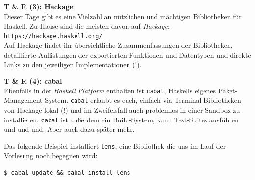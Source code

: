 \documentclass[unknownkeysallowed]{beamer}
\begin{document}
  
  \begin{frame}
    \begin{center}
    \Large\textbf{T \& R (3): Hackage}\\ \bigskip \normalsize
    Dieser Tage gibt es eine Vielzahl an nützlichen und mächtigen Bibliotheken für Haskell. Zu Hause sind die meisten davon auf \emph{Hackage}: \\ \bigskip \texttt{https://hackage.haskell.org/} \\ \bigskip
    Auf Hackage findet ihr übersichtliche Zusammenfassungen der Bibliotheken, detaillierte Auflistungen der exportierten Funktionen und Datentypen und direkte Links zu den jeweiligen Implementationen (!).
    \end{center}
  \end{frame}
  
  
  \begin{frame}
    \begin{center}
    \Large\textbf{T \& R (4): cabal}\\ \bigskip \normalsize
    Ebenfalls in der \emph{Haskell Platform} enthalten ist \texttt{cabal}, Haskells eigenes Paket-Management-System. \texttt{cabal} erlaubt es euch, einfach via Terminal Bibliotheken von Hackage lokal (!) und im Zweifelsfall auch problemlos in einer Sandbox zu installieren. \texttt{cabal} ist außerdem ein Build-System, kann Test-Suites ausführen und und und. Aber auch dazu später mehr.\bigskip
    
    Das folgende Beispiel installiert \texttt{lens}, eine Bibliothek die uns im Lauf der Vorlesung noch begegnen wird:\bigskip
   
    \texttt{\$ cabal update \&\& cabal install lens}
    
    
    \end{center}
  \end{frame}
  
  
\end{document}

